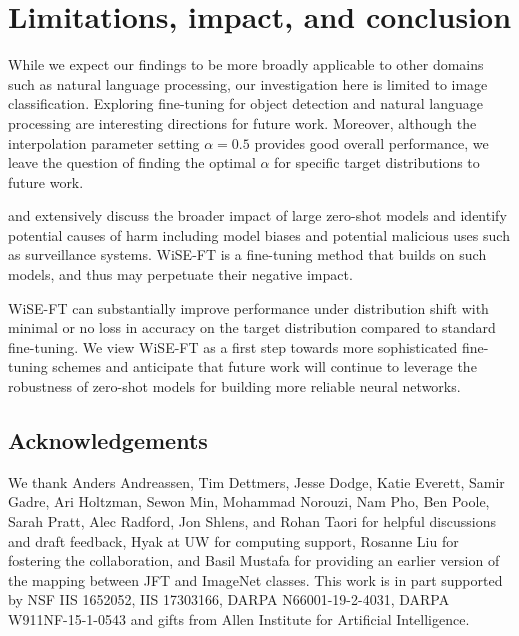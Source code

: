 \beforesec
\section{Limitations, impact, and conclusion}
\label{sec:conclusion}
\postsec
{} While we expect our findings to be more broadly applicable to other domains such as natural language processing, our investigation here is limited to image classification.
Exploring fine-tuning for object detection and natural language processing are interesting directions for future work.
Moreover, although the interpolation parameter setting $\alpha{=}0.5$ provides good overall performance, we leave the question of finding the optimal $\alpha$ for specific target distributions to future work.


 \citet{radford2021learning} and \citet{brown2020language} extensively discuss the broader impact of large zero-shot models and identify potential causes of harm including
 model biases and potential malicious uses such as surveillance systems.
 WiSE-FT is a fine-tuning method that builds on such models, and thus may perpetuate their negative impact.
 
WiSE-FT can substantially improve performance under distribution shift with minimal or no loss in accuracy on the target distribution compared to standard fine-tuning.
We view WiSE-FT as a first step towards more sophisticated fine-tuning schemes and anticipate that future work will continue to leverage the robustness of zero-shot models for building more reliable neural networks.







\subsection*{Acknowledgements}
We thank
Anders Andreassen,
Tim Dettmers,
Jesse Dodge,
Katie Everett,
Samir Gadre,
Ari Holtzman,
Sewon Min,
Mohammad Norouzi,
Nam Pho, 
Ben Poole,
Sarah Pratt,
Alec Radford,
Jon Shlens,
and Rohan Taori for helpful discussions and draft feedback, Hyak at UW for computing support, 
Rosanne Liu for fostering the collaboration,
and Basil Mustafa for providing an earlier version of the mapping between JFT and ImageNet classes.
This work is in part supported by NSF IIS 1652052, IIS 17303166, DARPA N66001-19-2-4031, DARPA W911NF-15-1-0543 and gifts from Allen Institute for Artificial Intelligence.